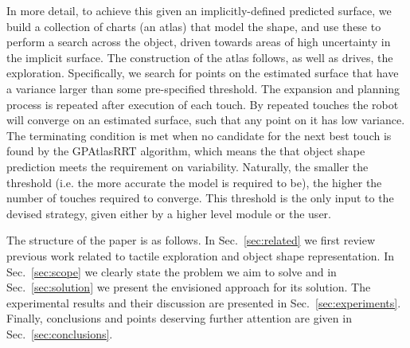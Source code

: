 In more detail, to achieve this given an implicitly-defined predicted surface, we build a collection of charts (an atlas) that model the shape, and use these to perform a search across the object, driven towards areas of high uncertainty in the implicit surface. The construction of the atlas follows, as well as drives, the exploration. Specifically, we search for points on the estimated surface that have a variance larger than some pre-specified threshold. The expansion and planning process is repeated after execution of each touch. By repeated touches the robot will converge on an estimated surface, such that any point on it has low variance. The terminating condition is met when no candidate for the next best touch is found by the GPAtlasRRT algorithm, which means the that object shape prediction meets the requirement on variability. Naturally, the smaller the threshold (i.e. the more accurate the model is required to be), the higher the number of touches required to converge. This threshold is the only input to the devised strategy, given either by a higher level module or the user.

The structure of the paper is as follows. In Sec.~\ref{sec:related} we first review previous work related to tactile exploration and object shape representation. In Sec.~\ref{sec:scope} we clearly state the problem we aim to solve and in Sec.~\ref{sec:solution} we present the envisioned approach for its solution. The experimental results and their discussion are presented in Sec.~\ref{sec:experiments}. Finally, conclusions and points deserving further attention are given in Sec.~\ref{sec:conclusions}.










